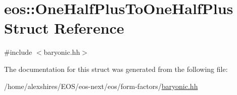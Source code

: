 \hypertarget{structeos_1_1OneHalfPlusToOneHalfPlus}{
\section{eos::OneHalfPlusToOneHalfPlus Struct Reference}
\label{structeos_1_1OneHalfPlusToOneHalfPlus}
}


{\ttfamily \#include $<$baryonic.hh$>$}

The documentation for this struct was generated from the following file:\begin{DoxyCompactItemize}
\item 
/home/alexshires/EOS/eos-\/next/eos/form-\/factors/\hyperlink{baryonic_8hh}{baryonic.hh}\end{DoxyCompactItemize}
